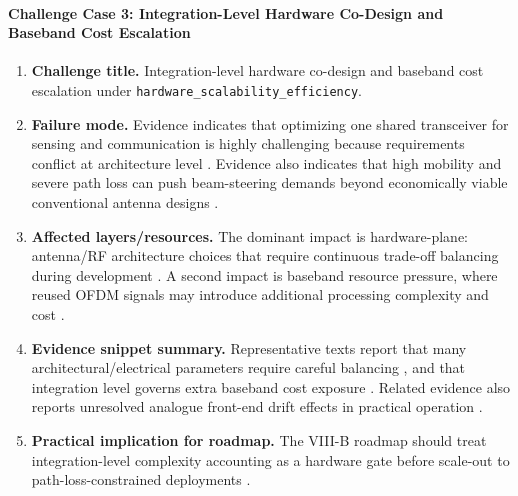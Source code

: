\documentclass[lettersize,journal]{IEEEtran}
\begin{document}
\paragraph{Challenge Case 3: Integration-Level Hardware Co-Design and Baseband Cost Escalation}
\begin{enumerate}
    \item \textbf{Challenge title.} Integration-level hardware co-design and baseband cost escalation under \texttt{hardware\_scalability\_efficiency}.
    \item \textbf{Failure mode.} Evidence indicates that optimizing one shared transceiver for sensing and communication is highly challenging because requirements conflict at architecture level \cite{O_ISAC_161}. Evidence also indicates that high mobility and severe path loss can push beam-steering demands beyond economically viable conventional antenna designs \cite{O_ISAC_142}.
    \item \textbf{Affected layers/resources.} The dominant impact is hardware-plane: antenna/RF architecture choices that require continuous trade-off balancing during development \cite{O_ISAC_161}. A second impact is baseband resource pressure, where reused OFDM signals may introduce additional processing complexity and cost \cite{O_ISAC_162}.
    \item \textbf{Evidence snippet summary.} Representative texts report that many architectural/electrical parameters require careful balancing \cite{O_ISAC_161}, and that integration level governs extra baseband cost exposure \cite{O_ISAC_162}. Related evidence also reports unresolved analogue front-end drift effects in practical operation \cite{O_ISAC_162}.
    \item \textbf{Practical implication for roadmap.} The VIII-B roadmap should treat integration-level complexity accounting as a hardware gate before scale-out to path-loss-constrained deployments \cite{O_ISAC_161, O_ISAC_142, O_ISAC_162}.
\end{enumerate}
\end{document}

